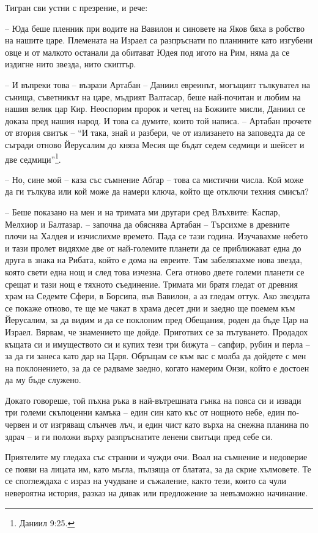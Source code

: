 Тигран сви устни с презрение, и рече:

-- Юда беше пленник при водите на Вавилон и синовете на Яков бяха в робство на
нашите царе. Племената на Израел са разпръснати по планините като изгубени овце
и от малкото останали да обитават Юдея под игото на Рим, няма да се издигне нито
звезда, нито скиптър.

-- И въпреки това -- възрази Артабан -- Даниил евреинът, могъщият тълкувател на
сънища, съветникът на царе, мъдрият Валтасар, беше най-почитан и любим на нашия
велик цар Кир. Неоспорим пророк и четец на Божиите мисли, Даниил се доказа пред
нашия народ. И това са думите, които той написа. -- Артабан прочете от втория
свитък -- ``И така, знай и разбери, че от излизането на заповедта да се съгради
отново Йерусалим до княза Месия ще бъдат седем седмици и шейсет и две
седмици''\footnote{Даниил 9:25.}.

-- Но, сине мой -- каза със съмнение Абгар -- това са мистични числа. Кой може
да ги тълкува или кой може да намери ключа, който ще отключи техния смисъл?

-- Беше показано на мен и на тримата ми другари сред Влъхвите: Каспар, Мелхиор и
Балтазар. -- започна да обяснява Артабан -- Търсихме в древните плочи на Халдея
и изчислихме времето. Пада се тази година. Изучавахме небето и тази пролет
видяхме две от най-големите планети да се приближават една до друга в знака на
Рибата, който е дома на евреите. Там забелязахме нова звезда, която свети една
нощ и след това изчезна. Сега отново двете големи планети се срещат и тази нощ е
тяхното съединение. Тримата ми братя гледат от древния храм на Седемте Сфери, в
Борсипа, във Вавилон, а аз гледам оттук. Ако звездата се покаже отново, те ще ме
чакат в храма десет дни и заедно ще поемем към Йерусалим, за да видим и да се
поклоним пред Обещания, роден да бъде Цар на Израел. Вярвам, че знамението ще
дойде. Приготвих се за пътуването. Продадох къщата си и имуществото си и купих
тези три бижута -- сапфир, рубин и перла -- за да ги занеса като дар на Царя.
Обръщам се към вас с молба да дойдете с мен на поклонението, за да се радваме
заедно, когато намерим Онзи, който е достоен да му бъде служено.

Докато говореше, той пъхна ръка в най-вътрешната гънка на пояса си и извади три
големи скъпоценни камъка -- един син като къс от нощното небе, един по-червен и
от изгряващ слънчев лъч, и един чист като върха на снежна планина по здрач -- и
ги положи върху разпръснатите ленени свитъци пред себе си.

Приятелите му гледаха със странни и чужди очи. Воал на съмнение и недоверие се
появи на лицата им, като мъгла, пълзяща от блатата, за да скрие хълмовете. Те се
споглеждаха с израз на учудване и съжаление, както тези, които са чули
невероятна история, разказ на дивак или предложение за невъзможно начинание.

